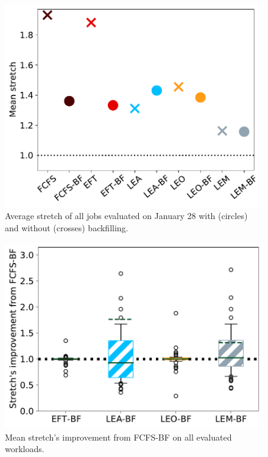\documentclass[conference,10pt]{IEEEtran}
\begin{document}
\begin{figure}[t]\centering\includegraphics[width=0.9\linewidth]{../MBSS/plot/BF_AND_NON_BF_Results_FCFS_Score_Backfill_2022-01-28->2022-01-28_V10000_Mean_Stretch_450_128_32_256_4_1024.pdf}\caption{Average stretch of all jobs evaluated on January 28 with (circles) and without (crosses) backfilling.}\label{stretch.01-28}\end{figure}
\begin{figure}[t]\centering\includegraphics[width=0.9\linewidth]{../MBSS/plot/Boxplot/box_plot_mean_stretch_all_workloads_bf.pdf}\caption{Mean stretch's improvement from FCFS-BF on all evaluated workloads.}\label{boxplot.all_bf}\end{figure}
\end{document}
